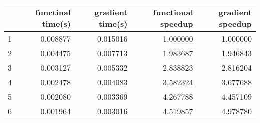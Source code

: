 \begin{tabular}{lrrrr}
\toprule
{} &  functinal time(s) &  gradient time(s) &  functional speedup &  gradient speedup \\
\midrule
1 &           0.008877 &          0.015016 &            1.000000 &          1.000000 \\
2 &           0.004475 &          0.007713 &            1.983687 &          1.946843 \\
3 &           0.003127 &          0.005332 &            2.838823 &          2.816204 \\
4 &           0.002478 &          0.004083 &            3.582324 &          3.677688 \\
5 &           0.002080 &          0.003369 &            4.267788 &          4.457109 \\
6 &           0.001964 &          0.003016 &            4.519857 &          4.978780 \\
\bottomrule
\end{tabular}
